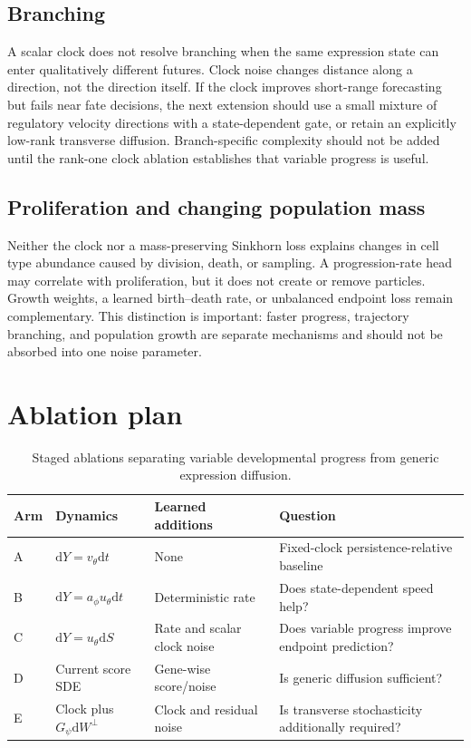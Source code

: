 \documentclass[11pt]{article}
\newcommand{\dd}{\mathrm{d}}
\begin{document}
\subsection{Branching}

A scalar clock does not resolve branching when the same expression state can
enter qualitatively different futures. Clock noise changes distance along a
direction, not the direction itself. If the clock improves short-range
forecasting but fails near fate decisions, the next extension should use a
small mixture of regulatory velocity directions with a state-dependent gate,
or retain an explicitly low-rank transverse diffusion. Branch-specific
complexity should not be added until the rank-one clock ablation establishes
that variable progress is useful.

\subsection{Proliferation and changing population mass}

Neither the clock nor a mass-preserving Sinkhorn loss explains changes in cell
type abundance caused by division, death, or sampling. A progression-rate
head may correlate with proliferation, but it does not create or remove
particles. Growth weights, a learned birth--death rate, or unbalanced endpoint
loss remain complementary. This distinction is important: faster progress,
trajectory branching, and population growth are separate mechanisms and
should not be absorbed into one noise parameter.

\section{Ablation plan}

\begin{table}[ht]
\centering
\small
\begin{tabular}{@{}p{}p{}p{}p{}@{}}
\toprule
Arm & Dynamics & Learned additions & Question \\
\midrule
A & $\dd Y=v_\theta\dd t$ & None & Fixed-clock persistence-relative baseline \\
B & $\dd Y=a_\phi u_\theta\dd t$ & Deterministic rate & Does state-dependent speed help? \\
C & $\dd Y=u_\theta\dd S$ & Rate and scalar clock noise & Does variable progress improve endpoint prediction? \\
D & Current score SDE & Gene-wise score/noise & Is generic diffusion sufficient? \\
E & Clock plus $G_\psi\dd W^\perp$ & Clock and residual noise & Is transverse stochasticity additionally required? \\
\bottomrule
\end{tabular}
\caption{Staged ablations separating variable developmental progress from generic expression diffusion.}
\label{tab:ablations}
\end{table}
\end{document}
